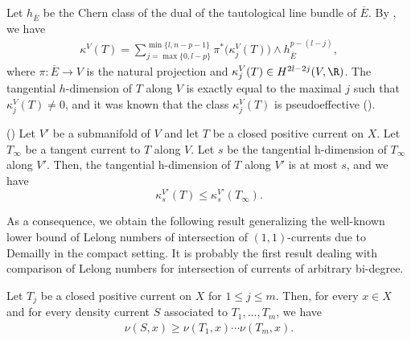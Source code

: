    Let $h_{\overline E}$ be the Chern class of the dual of the tautological line bundle of $\overline E$. By \cite[Page 535]{Dinh_Sibony_density}, we have  
    \begin{align} \label{eq_kappaVT}
        \kappa^V(T)=\sum_{j=\max \{0, l-p\}}^{\min\{l, n-p-1\}} \pi^*\big( \kappa^V_j(T)\big) \wedge h_{\overline E}^{p-(l-j)},
    \end{align} 
    where $\pi: \overline E \to V$ is the natural projection and $\kappa^V_j(T) \in H^{2l-2j}(V, \R)$. The tangential $h$-dimension of $T$ along $V$ is exactly equal to the maximal $j$ such that $\kappa^V_j(T)  \not = 0$, and it was known that the class $\kappa^V_j(T)$ is pseudoeffective (\cite[Lemma 3.15]{Dinh_Sibony_density}). 



    \begin{theorem} \label{th-sosanhVV'densityDS} (\cite[Proposition 4.13]{Dinh_Sibony_density})    Let  $V'$ be a submanifold of $V$ and let $T$ be a closed positive current on $X$. Let       $T_\infty$ be a tangent current to $T$ along $V$. Let $s$ be the tangential h-dimension      of $T_\infty$ along $V'$. Then, the tangential h-dimension of $T$ along $V'$ is at most      $s$, and we have  
            $$\kappa^{V'}_s(T) \le \kappa^{V'}_s(T_\infty).$$
    \end{theorem}

    As a consequence, we obtain the following result generalizing the well-known lower bound of Lelong numbers of intersection of $(1,1)$-currents due to Demailly \cite[Page 169]{Demailly_analyticmethod} in the compact setting. It is probably the first result dealing with comparison of Lelong numbers for intersection of currents of arbitrary bi-degree. 

    \begin{corollary}\label{cor-sosanhlelong} 
        Let $T_j$ be a closed positive current on $X$ for $1 \le j \le m$. Then, for every $x \in X$ and for every density current $S$ associated to $T_1, \ldots, T_{m}$, we have 
        \begin{align}\label{inesosanhSTjlelong}
            \nu(S, x) \ge \nu(T_1, x) \cdots \nu(T_m,x).
        \end{align}
    \end{corollary} 

